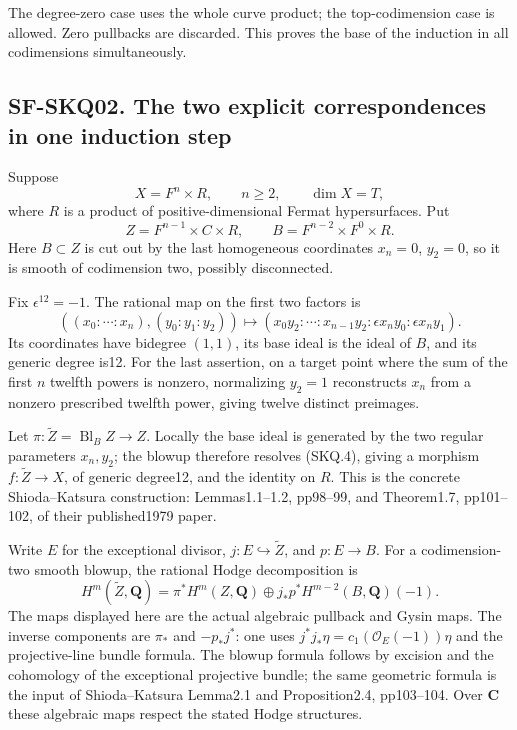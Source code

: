 The degree-zero case uses the whole curve product; the top-codimension
case is allowed. Zero pullbacks are discarded. This proves the base of
the induction in all codimensions simultaneously.

\subsection{SF-SKQ02. The two explicit correspondences in one induction
step}\label{SF-SKQ02}

Suppose \[
 X=F^n\times R,\qquad n\ge2,\qquad \dim X=T,
\] where \(R\) is a product of positive-dimensional Fermat
hypersurfaces. Put \[
 Z=F^{n-1}\times C\times R,\qquad
 B=F^{n-2}\times F^0\times R.
\] Here \(B\subset Z\) is cut out by the last homogeneous coordinates
\(x_n=0\), \(y_2=0\), so it is smooth of codimension two, possibly
disconnected.

Fix \(\epsilon^{12}=-1\). The rational map on the first two factors is
\[
 ((x_0:\cdots:x_n),(y_0:y_1:y_2))
 \longmapsto
 (x_0y_2:\cdots:x_{n-1}y_2:
       \epsilon x_ny_0:\epsilon x_ny_1).
 \tag{SKQ.4}
\] Its coordinates have bidegree \((1,1)\), its base ideal is the ideal
of \(B\), and its generic degree is12. For the last assertion, on a
target point where the sum of the first \(n\) twelfth powers is nonzero,
normalizing \(y_2=1\) reconstructs \(x_n\) from a nonzero prescribed
twelfth power, giving twelve distinct preimages.

Let \(\pi:\widetilde Z=\operatorname{Bl}_B Z\to Z\). Locally the base
ideal is generated by the two regular parameters \(x_n,y_2\); the blowup
therefore resolves (SKQ.4), giving a morphism \(f:\widetilde Z\to X\),
of generic degree12, and the identity on \(R\). This is the concrete
Shioda--Katsura construction: Lemmas1.1--1.2, pp98--99, and Theorem1.7,
pp101--102, of their published1979 paper.

Write \(E\) for the exceptional divisor,
\(j:E\hookrightarrow\widetilde Z\), and \(p:E\to B\). For a
codimension-two smooth blowup, the rational Hodge decomposition is \[
 H^m(\widetilde Z,\mathbf Q)
 =
 \pi^*H^m(Z,\mathbf Q)
 \oplus j_*p^*H^{m-2}(B,\mathbf Q)(-1).
 \tag{SKQ.5}
\] The maps displayed here are the actual algebraic pullback and Gysin
maps. The inverse components are \(\pi_*\) and \(-p_*j^*\): one uses
\(j^*j_*\eta=c_1(\mathcal O_E(-1))\eta\) and the projective-line bundle
formula. The blowup formula follows by excision and the cohomology of
the exceptional projective bundle; the same geometric formula is the
input of Shioda--Katsura Lemma2.1 and Proposition2.4, pp103--104. Over
\(\mathbf C\) these algebraic maps respect the stated Hodge structures.

